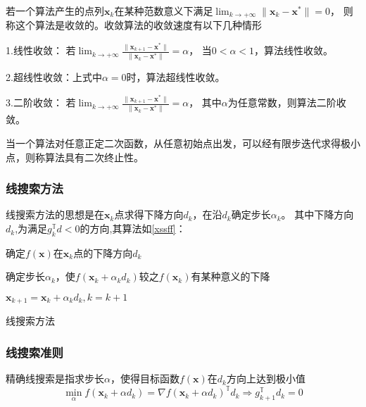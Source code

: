 若一个算法产生的点列${\bm{x}_k}$在某种范数意义下满足$\displaystyle\lim_{k \to +\infty}\|\bm{x}_k-\bm{x}^*\|=0$，
则称这个算法是收敛的。收敛算法的收敛速度有以下几种情形

1.线性收敛：
若$\displaystyle\lim_{k \to +\infty}\frac{\|\bm{x}_{k+1}-\bm{x}^*\|}{\|\bm{x}_k-\bm{x}^*\|}= \alpha$，
当$0 < \alpha < 1$，算法线性收敛。

2.超线性收敛：上式中$\alpha = 0$时，算法超线性收敛。

3.二阶收敛：
若$\displaystyle\lim_{k \to +\infty}\frac{\|\bm{x}_{k+1}-\bm{x}^*\|}{\|\bm{x}_k-\bm{x}^*\|}=\alpha$，
其中$\alpha$为任意常数，则算法二阶收敛。
    
\begin{definition}[二次终止性]
    当一个算法对任意正定二次函数，从任意初始点出发，可以经有限步迭代求得极小点，则称算法具有二次终止性。
\end{definition}
    
\subsubsection{线搜索方法}
线搜索方法的思想是在$\bm{x}_k$点求得下降方向$d_k$，在沿$d_k$确定步长$\alpha_k$。
其中下降方向$d_k$,为满足$g_k^{\mathbb{T}}d<0$的方向,其算法如\ref{xssff}：

\begin{algorithm}\label{xssff}

    \SetAlgoLined

     {
        确定$f(\bm{x})$在$\bm{x}_k$点的下降方向$d_k$
        
        确定步长$\alpha_k$，使$f(\bm{x}_k + \alpha_kd_k)$较之$f(\bm{x}_k)$有某种意义的下降
        
        $\bm{x}_{k+1} = \bm{x}_k + \alpha_kd_k,k=k+1$
    }
    \caption{线搜索方法}
\end{algorithm}


\subsubsection{线搜索准则}

\begin{theorem}[精确线搜索准则]
    精确线搜索是指求步长$\alpha$，使得目标函数$f(\bm{x})$在$d_k$方向上达到极小值
    \begin{equation}
        \min_\alpha f(\bm{x}_k+\alpha d_k) = \nabla f(\bm{x}_k+\alpha d_k)^{\mathbb{T}}d_k \Rightarrow g_{k+1}^{\mathbb{T}}d_k=0
    \end{equation}
\end{theorem}

